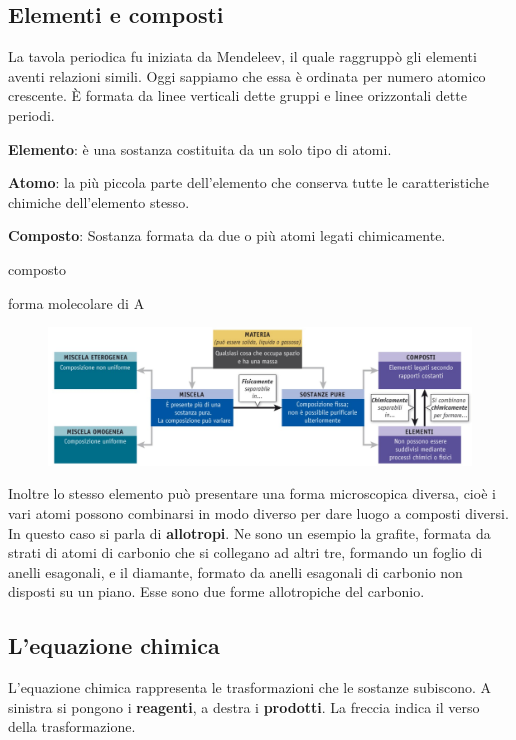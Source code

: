 \subsection{Elementi e composti}
La tavola periodica fu iniziata da Mendeleev, il quale raggruppò gli elementi aventi relazioni simili. Oggi sappiamo che essa è ordinata per numero atomico crescente. È formata da linee verticali dette gruppi e linee orizzontali dette periodi.

\textbf{Elemento}: è una sostanza costituita da un solo tipo di atomi.

\textbf{Atomo}: la più piccola parte dell'elemento che conserva tutte le
caratteristiche chimiche dell'elemento stesso.

\textbf{Composto}: Sostanza formata da due o più atomi legati
chimicamente.

\vspace{0.2cm} composto

\vspace{0.2cm} forma molecolare di A

\begin{figure}[H]
    \hspace{-0.2cm}\includegraphics[width=16cm]{immagini/materia.jpg}
\end{figure}

Inoltre lo stesso elemento può presentare una forma microscopica diversa, cioè i vari atomi possono combinarsi in modo diverso per dare luogo a composti diversi. In questo caso si parla di \textbf{allotropi}. Ne sono un esempio la grafite, formata da strati di atomi di carbonio che si collegano ad altri tre, formando un foglio di anelli esagonali, e il diamante, formato da anelli esagonali di carbonio non disposti su un piano. Esse sono due forme allotropiche del carbonio.
\subsection{L'equazione chimica}

L'equazione chimica rappresenta le trasformazioni che le sostanze subiscono. A sinistra si pongono i \textbf{reagenti}, a destra i \textbf{prodotti}. La freccia indica il verso della trasformazione. 

